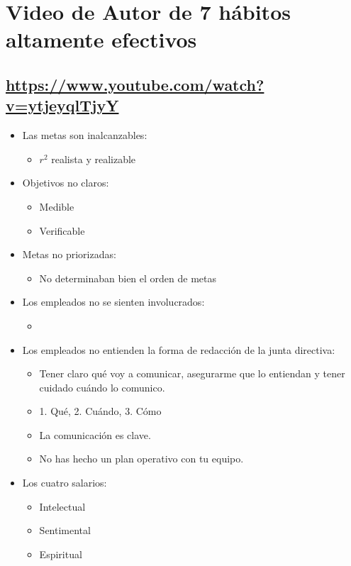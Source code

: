 \section{Video de Autor de 7 hábitos altamente efectivos}

\subsection{\url{https://www.youtube.com/watch?v=ytjeyqlTjyY}}
\begin{itemize}
    \item Las metas son inalcanzables:
        \begin{itemize}
            \item $r^2$ realista y realizable
        \end{itemize}
    
    \item Objetivos no claros:
        \begin{itemize}
            \item Medible 
            \item Verificable 
        \end{itemize}
    
    \item Metas no priorizadas:
        \begin{itemize}
            \item No determinaban bien el orden de metas 
        \end{itemize}
    
    
    \item Los empleados no se sienten involucrados:
        \begin{itemize}
            \item {}  
        \end{itemize}
        
    \item Los empleados no entienden la forma de redacción de la junta directiva: 
        \begin{itemize}
            \item Tener claro qué voy a comunicar, asegurarme que lo entiendan y tener cuidado cuándo lo comunico.
            \item 1. Qué, 2. Cuándo, 3. Cómo 
            \item La comunicación es clave.
            \item No has hecho un plan operativo con tu equipo. 
        \end{itemize}
    
    \item Los cuatro salarios:
        \begin{itemize}
            \item Intelectual 
            \item Sentimental 
            \item Espiritual
        \end{itemize}
\end{itemize}


